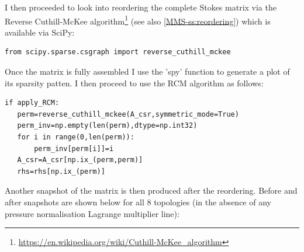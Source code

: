 I then proceeded to look into reordering the complete 
Stokes matrix via the Reverse Cuthill-McKee 
algorithm\footnote{\url{https://en.wikipedia.org/wiki/Cuthill-McKee_algorithm}}
(see also \ref{MMS-ss:reordering}) which is available via SciPy:
\begin{lstlisting} 
from scipy.sparse.csgraph import reverse_cuthill_mckee
\end{lstlisting} 
Once the matrix is fully assembled I use the 'spy' function 
to generate a plot of its sparsity patten.
I then proceed to use the RCM algorithm as follows:
\begin{lstlisting} 
if apply_RCM:
   perm=reverse_cuthill_mckee(A_csr,symmetric_mode=True)
   perm_inv=np.empty(len(perm),dtype=np.int32)
   for i in range(0,len(perm)):
       perm_inv[perm[i]]=i
   A_csr=A_csr[np.ix_(perm,perm)]
   rhs=rhs[np.ix_(perm)]
\end{lstlisting} 
Another snapshot of the matrix is then produced after the reordering. 
Before and after snapshots are shown below for all 8 topologies 
(in the absence of any pressure normalisation Lagrange multiplier line):

